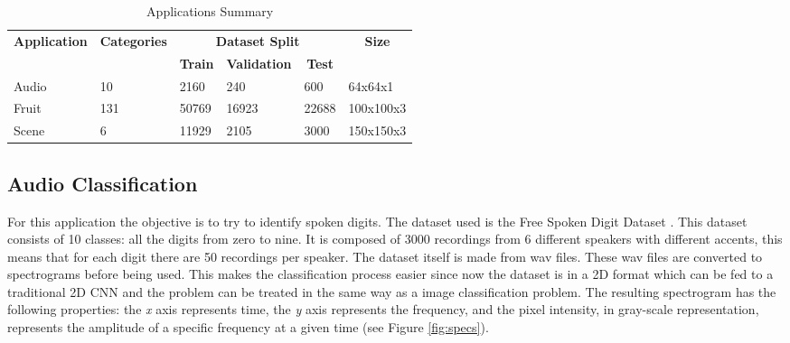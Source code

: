 \begin{table}[thbp]
\centering
\caption{Applications Summary}
\label{tab:app_summary}
\begin{tabular}{|l|l|l|l|l|l|}
\hline
\multicolumn{1}{|c|}{\multirow{2}{*}{\textbf{Application}}} & \multicolumn{1}{c|}{\multirow{2}{*}{\textbf{Categories}}} & \multicolumn{3}{c|}{\textbf{Dataset Split}}                                                       & \multicolumn{1}{c|}{\multirow{2}{*}{\textbf{Size}}} \\ \cline{3-5}
\multicolumn{1}{|c|}{}                             & \multicolumn{1}{c|}{}                            & \multicolumn{1}{c|}{\textbf{Train}} & \multicolumn{1}{c|}{\textbf{Validation}} & \multicolumn{1}{c|}{\textbf{Test}} & \multicolumn{1}{c|}{}                      \\ \hline
Audio                                              & 10                                               & 2160                       & 240                             & 600                       & 64x64x1                                    \\ \hline
Fruit                                              & 131                                              & 50769                      & 16923                           & 22688                     & 100x100x3                                  \\ \hline
Scene                                              & 6                                                & 11929                      & 2105                            & 3000                      & 150x150x3                                  \\ \hline
\end{tabular}
\end{table}

\subsection{Audio Classification}

For this application the objective is to try to identify spoken digits. The dataset used is the Free Spoken Digit Dataset \cite{fsdd}. This dataset consists of 10 classes: all the digits from zero to nine. It is composed of 3000 recordings from 6 different speakers with different accents, this means that for each digit there are 50 recordings per speaker. The dataset itself is made from wav files. These wav files are converted to spectrograms before being used. This makes the classification process easier since now the dataset is in a 2D format which can be fed to a traditional 2D CNN and the problem can be treated in the same way as a image classification problem. The resulting spectrogram has the following properties: the \textit{x} axis represents time, the \textit{y} axis represents the frequency, and the pixel intensity, in gray-scale representation, represents the amplitude of a specific frequency at a given time (see Figure \ref{fig:specs}).

